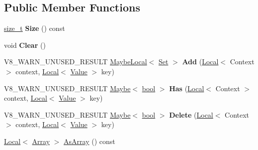 \subsection*{Public Member Functions}
\begin{DoxyCompactItemize}
\item 
\mbox{\label{classv8_1_1Set_af44475aaf38b9429e129d62c34bcc024}} 
\mbox{\hyperlink{classsize__t}{size\+\_\+t}} {\bfseries Size} () const
\item 
\mbox{\label{classv8_1_1Set_a5f7e4dbd6729a503ca617415d5eeedf0}} 
void {\bfseries Clear} ()
\item 
\mbox{\label{classv8_1_1Set_afe7b3f75000e7bca468199e87cea27b7}} 
V8\+\_\+\+W\+A\+R\+N\+\_\+\+U\+N\+U\+S\+E\+D\+\_\+\+R\+E\+S\+U\+LT \mbox{\hyperlink{classv8_1_1MaybeLocal}{Maybe\+Local}}$<$ \mbox{\hyperlink{classv8_1_1Set}{Set}} $>$ {\bfseries Add} (\mbox{\hyperlink{classv8_1_1Local}{Local}}$<$ Context $>$ context, \mbox{\hyperlink{classv8_1_1Local}{Local}}$<$ \mbox{\hyperlink{classv8_1_1Value}{Value}} $>$ key)
\item 
\mbox{\label{classv8_1_1Set_ac8703cf3d49bb0142f3425ac57fe0679}} 
V8\+\_\+\+W\+A\+R\+N\+\_\+\+U\+N\+U\+S\+E\+D\+\_\+\+R\+E\+S\+U\+LT \mbox{\hyperlink{classv8_1_1Maybe}{Maybe}}$<$ \mbox{\hyperlink{classbool}{bool}} $>$ {\bfseries Has} (\mbox{\hyperlink{classv8_1_1Local}{Local}}$<$ Context $>$ context, \mbox{\hyperlink{classv8_1_1Local}{Local}}$<$ \mbox{\hyperlink{classv8_1_1Value}{Value}} $>$ key)
\item 
\mbox{\label{classv8_1_1Set_a680215d1b7b1c2c52848f70ae9f6d01a}} 
V8\+\_\+\+W\+A\+R\+N\+\_\+\+U\+N\+U\+S\+E\+D\+\_\+\+R\+E\+S\+U\+LT \mbox{\hyperlink{classv8_1_1Maybe}{Maybe}}$<$ \mbox{\hyperlink{classbool}{bool}} $>$ {\bfseries Delete} (\mbox{\hyperlink{classv8_1_1Local}{Local}}$<$ Context $>$ context, \mbox{\hyperlink{classv8_1_1Local}{Local}}$<$ \mbox{\hyperlink{classv8_1_1Value}{Value}} $>$ key)
\item 
\mbox{\hyperlink{classv8_1_1Local}{Local}}$<$ \mbox{\hyperlink{classv8_1_1Array}{Array}} $>$ \mbox{\hyperlink{classv8_1_1Set_a7315c5d4efd3185018180f94c2303975}{As\+Array}} () const
\end{DoxyCompactItemize}

